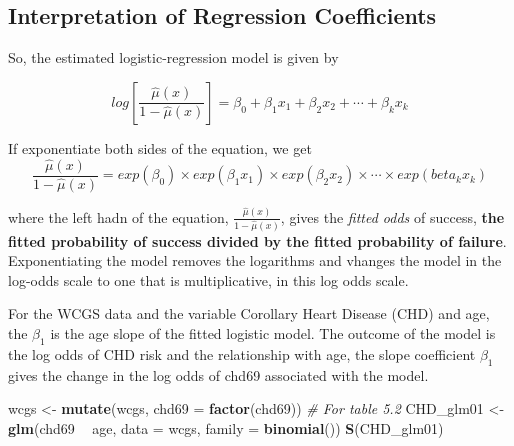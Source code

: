 \documentclass[
]{article}
\newenvironment{Shaded}{\begin{snugshade}}{\end{snugshade}}
\newcommand{\CommentTok}[1]{\textcolor[rgb]{0.56,0.35,0.01}{\textit{#1}}}
\newcommand{\DataTypeTok}[1]{\textcolor[rgb]{0.13,0.29,0.53}{#1}}
\newcommand{\KeywordTok}[1]{\textcolor[rgb]{0.13,0.29,0.53}{\textbf{#1}}}
\newcommand{\NormalTok}[1]{#1}
\newcommand{\OperatorTok}[1]{\textcolor[rgb]{0.81,0.36,0.00}{\textbf{#1}}}
\newcommand{\StringTok}[1]{\textcolor[rgb]{0.31,0.60,0.02}{#1}}
\begin{document}
\hypertarget{interpretation-of-regression-coefficients}{%
\subsection{Interpretation of Regression
Coefficients}\label{interpretation-of-regression-coefficients}}

So, the estimated logistic-regression model is given by

\[log[\frac{\hat\mu(x)}{1-\hat\mu(x)}] = \beta_0 + \beta_1 x_1 + \beta_2 x_2 + \cdots + \beta_k x_k\]

If exponentiate both sides of the equation, we get
\[\frac{\hat\mu(x)}{1-\hat\mu(x)} = exp(\beta_0) \times exp(\beta_1 x_1) \times exp(\beta_2 x_2) \times \cdots \times exp(beta_k x_k)\]

where the left hadn of the equation,
\(\frac{\hat\mu(x)}{1-\hat\mu(x)}\), gives the \emph{fitted odds} of
success, \textbf{the fitted probability of success divided by the fitted
probability of failure}. Exponentiating the model removes the logarithms
and vhanges the model in the log-odds scale to one that is
multiplicative, in this log odds scale.

For the WCGS data and the variable Corollary Heart Disease (CHD) and
age, the \(\beta_1\) is the age slope of the fitted logistic model. The
outcome of the model is the log odds of CHD risk and the relationship
with age, the slope coefficient \(\beta_1\) gives the change in the log
odds of chd69 associated with the model.

\begin{Shaded}
\begin{Highlighting}[]
\NormalTok{wcgs <-}\StringTok{ }\KeywordTok{mutate}\NormalTok{(wcgs, }\DataTypeTok{chd69 =} \KeywordTok{factor}\NormalTok{(chd69))}
\CommentTok{# For table 5.2}
\NormalTok{CHD_glm01 <-}\StringTok{ }\KeywordTok{glm}\NormalTok{(chd69 }\OperatorTok{~}\StringTok{ }\NormalTok{age, }\DataTypeTok{data =}\NormalTok{ wcgs, }\DataTypeTok{family =} \KeywordTok{binomial}\NormalTok{())}
\KeywordTok{S}\NormalTok{(CHD_glm01)}
\end{Highlighting}
\end{Shaded}
\end{document}
